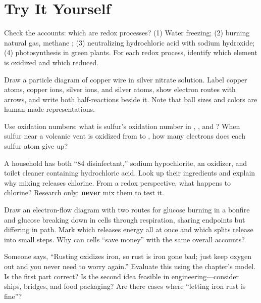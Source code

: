 \section*{Try It Yourself}

\begin{sikaoti}
\item Check the accounts: which are redox processes? (1) Water freezing; (2) burning natural gas, methane ; (3) neutralizing hydrochloric acid with sodium hydroxide; (4) photosynthesis in green plants. For each redox process, identify which element is oxidized and which reduced.
\item Draw a particle diagram of copper wire in silver nitrate solution. Label copper atoms, copper ions, silver ions, and silver atoms, show electron routes with arrows, and write both half-reactions beside it. Note that ball sizes and colors are human-made representations.
\item Use oxidation numbers: what is sulfur's oxidation number in , , and ? When sulfur near a volcanic vent is oxidized from  to , how many electrons does each sulfur atom give up?
\item A household has both ``84 disinfectant,'' sodium hypochlorite, an oxidizer, and toilet cleaner containing hydrochloric acid. Look up their ingredients and explain why mixing releases chlorine. From a redox perspective, what happens to chlorine? Research only: \textbf{never} mix them to test it.
\item Draw an electron-flow diagram with two routes for glucose burning in a bonfire and glucose breaking down in cells through respiration, sharing endpoints but differing in path. Mark which releases energy all at once and which splits release into small steps. Why can cells ``save money'' with the same overall accounts?
\item Someone says, ``Rusting oxidizes iron, so rust is iron gone bad; just keep oxygen out and you never need to worry again.'' Evaluate this using the chapter's model. Is the first part correct? Is the second idea feasible in engineering---consider ships, bridges, and food packaging? Are there cases where ``letting iron rust is fine''?
\end{sikaoti}
